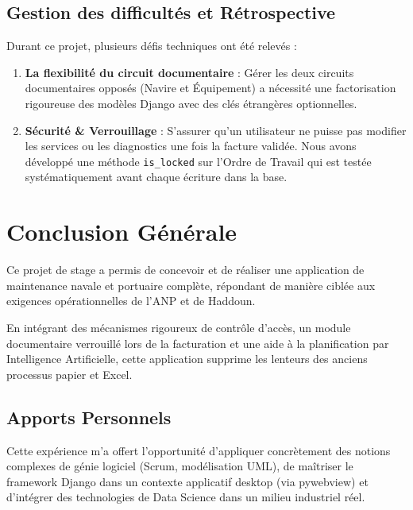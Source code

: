 \documentclass[12pt,a4paper,oneside]{report}
\begin{document}
\section{Gestion des difficultés et Rétrospective}
Durant ce projet, plusieurs défis techniques ont été relevés :
\begin{enumerate}
    \item \textbf{La flexibilité du circuit documentaire} : Gérer les deux circuits documentaires opposés (Navire et Équipement) a nécessité une factorisation rigoureuse des modèles Django avec des clés étrangères optionnelles.
    \item \textbf{Sécurité \& Verrouillage} : S'assurer qu'un utilisateur ne puisse pas modifier les services ou les diagnostics une fois la facture validée. Nous avons développé une méthode \texttt{is_locked} sur l'Ordre de Travail qui est testée systématiquement avant chaque écriture dans la base.
\end{enumerate}

\chapter*{Conclusion Générale}

Ce projet de stage a permis de concevoir et de réaliser une application de maintenance navale et portuaire complète, répondant de manière ciblée aux exigences opérationnelles de l'ANP et de Haddoun. 

En intégrant des mécanismes rigoureux de contrôle d'accès, un module documentaire verrouillé lors de la facturation et une aide à la planification par Intelligence Artificielle, cette application supprime les lenteurs des anciens processus papier et Excel.

\section*{Apports Personnels}
Cette expérience m'a offert l'opportunité d'appliquer concrètement des notions complexes de génie logiciel (Scrum, modélisation UML), de maîtriser le framework Django dans un contexte applicatif desktop (via pywebview) et d'intégrer des technologies de Data Science dans un milieu industriel réel.
\end{document}
